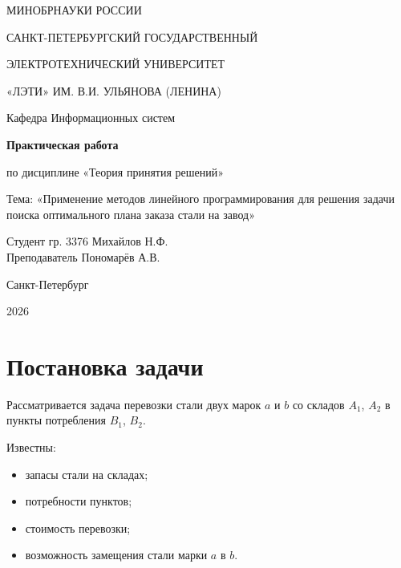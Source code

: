 \documentclass[a4paper,12pt]{article}
\begin{document}
\begin{titlepage}
    \centering
    {\large МИНОБРНАУКИ РОССИИ\par}
    \vspace{0.5em}
    {\large САНКТ-ПЕТЕРБУРГСКИЙ ГОСУДАРСТВЕННЫЙ\par}
    {\large ЭЛЕКТРОТЕХНИЧЕСКИЙ УНИВЕРСИТЕТ\par}
    {\large «ЛЭТИ» ИМ. В.И. УЛЬЯНОВА (ЛЕНИНА)\par}
    \vspace{1em}
    {\large Кафедра Информационных систем\par}

    \vspace{6em}

    {\LARGE \textbf{Практическая работа}\par}
    \vspace{0.8em}
    {\large по дисциплине «Теория принятия решений»\par}
    \vspace{0.8em}
    {\large Тема: «Применение методов линейного программирования для решения задачи поиска оптимального плана заказа стали на завод»\par}

    \vfill

    \begin{flushleft}
        Студент гр. 3376 \hfill Михайлов Н.Ф.\\[0.5em]
        Преподаватель   \hfill Пономарёв А.В.
    \end{flushleft}

    \vspace{3em}

    Санкт-Петербург\par
    2026
\end{titlepage}

\tableofcontents
\newpage

\section{Постановка задачи}

Рассматривается задача перевозки стали двух марок $a$ и $b$
со складов $A_1$, $A_2$ в пункты потребления $B_1$, $B_2$.

Известны:
\begin{itemize}
    \item запасы стали на складах;
    \item потребности пунктов;
    \item стоимость перевозки;
    \item возможность замещения стали марки $a$ в $b$.
\end{itemize}
\end{document}
